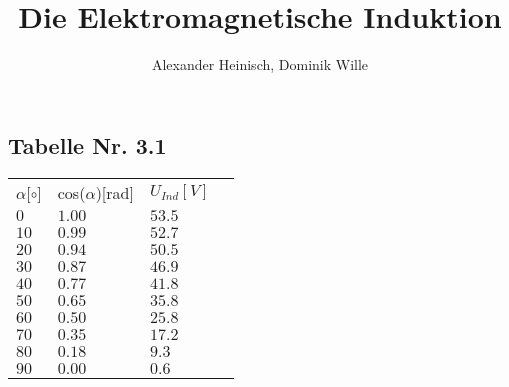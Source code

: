 \documentclass{article}
\title{Die Elektromagnetische Induktion}
\author{Alexander Heinisch, Dominik Wille}
\begin{document}
\subsection*{Tabelle Nr. 3.1}
\begin{tabular}{l l l l}
\(\alpha\)[\(\circ\)] & cos(\(\alpha\))[rad] & \(U_{Ind}[V]\) \\
\(0\) &	\(1.00\) &	\(53.5\) \\
\(10\) &	\(0.99\) &	\(52.7\) \\
\(20\) &	\(0.94\) &	\(50.5\) \\
\(30\) &	\(0.87\) &	\(46.9\) \\
\(40\) &	\(0.77\) &	\(41.8\) \\
\(50\) &	\(0.65\) &	\(35.8\) \\
\(60\) &	\(0.50\) &	\(25.8\) \\
\(70\) &	\(0.35\) &	\(17.2\) \\
\(80\) &	\(0.18\) &	\(9.3\) \\
\(90\) &	\(0.00\) &	\(0.6\) \\


\end{tabular}
\end{document}
